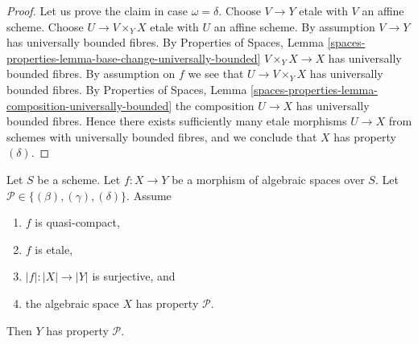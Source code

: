 \begin{proof}
\medskip\noindent
Let us prove the claim in case $\omega = \delta$.
Choose $V \to Y$ etale with $V$ an affine scheme.
Choose $U \to V \times_Y X$ etale with $U$ an affine scheme.
By assumption $V \to Y$ has universally bounded fibres. By
Properties of Spaces,
Lemma \ref{spaces-properties-lemma-base-change-universally-bounded}
$V \times_Y X \to X$ has universally bounded fibres.
By assumption on $f$ we see that $U \to V \times_Y X$ has
universally bounded fibres. By
Properties of Spaces,
Lemma \ref{spaces-properties-lemma-composition-universally-bounded}
the composition $U \to X$ has universally bounded fibres.
Hence there exists sufficiently many etale morphisms $U \to X$
from schemes with universally bounded fibres, and we conclude
that $X$ has property $(\delta)$.
\end{proof}

\begin{lemma}
\label{lemma-descent-conditions}
Let $S$ be a scheme.
Let $f : X \to Y$ be a morphism of algebraic spaces over $S$.
Let $\mathcal{P} \in \{(\beta), (\gamma), (\delta)\}$.
Assume
\begin{enumerate}
\item $f$ is quasi-compact,
\item $f$ is etale,
\item $|f| : |X| \to |Y|$ is surjective, and
\item the algebraic space $X$ has property $\mathcal{P}$.
\end{enumerate}
Then $Y$ has property $\mathcal{P}$.
\end{lemma}

